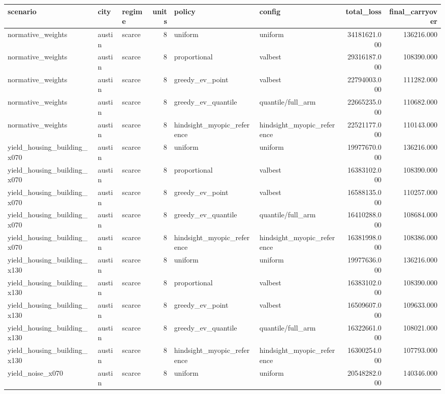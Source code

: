\begin{tabular}{lllrllrr}
\toprule
scenario & city & regime & units & policy & config & total\_loss & final\_carryover \\
\midrule
normative\_weights & austin & scarce & 8 & uniform & uniform & 34181621.000 & 136216.000 \\
normative\_weights & austin & scarce & 8 & proportional & valbest & 29316187.000 & 108390.000 \\
normative\_weights & austin & scarce & 8 & greedy\_ev\_point & valbest & 22794003.000 & 111282.000 \\
normative\_weights & austin & scarce & 8 & greedy\_ev\_quantile & quantile/full\_arm & 22665235.000 & 110682.000 \\
normative\_weights & austin & scarce & 8 & hindsight\_myopic\_reference & hindsight\_myopic\_reference & 22521177.000 & 110143.000 \\
yield\_housing\_building\_x070 & austin & scarce & 8 & uniform & uniform & 19977670.000 & 136216.000 \\
yield\_housing\_building\_x070 & austin & scarce & 8 & proportional & valbest & 16383102.000 & 108390.000 \\
yield\_housing\_building\_x070 & austin & scarce & 8 & greedy\_ev\_point & valbest & 16588135.000 & 110257.000 \\
yield\_housing\_building\_x070 & austin & scarce & 8 & greedy\_ev\_quantile & quantile/full\_arm & 16410288.000 & 108684.000 \\
yield\_housing\_building\_x070 & austin & scarce & 8 & hindsight\_myopic\_reference & hindsight\_myopic\_reference & 16381998.000 & 108386.000 \\
yield\_housing\_building\_x130 & austin & scarce & 8 & uniform & uniform & 19977636.000 & 136216.000 \\
yield\_housing\_building\_x130 & austin & scarce & 8 & proportional & valbest & 16383102.000 & 108390.000 \\
yield\_housing\_building\_x130 & austin & scarce & 8 & greedy\_ev\_point & valbest & 16509607.000 & 109633.000 \\
yield\_housing\_building\_x130 & austin & scarce & 8 & greedy\_ev\_quantile & quantile/full\_arm & 16322661.000 & 108021.000 \\
yield\_housing\_building\_x130 & austin & scarce & 8 & hindsight\_myopic\_reference & hindsight\_myopic\_reference & 16300254.000 & 107793.000 \\
yield\_noise\_x070 & austin & scarce & 8 & uniform & uniform & 20548282.000 & 140346.000 \\

\end{tabular}
